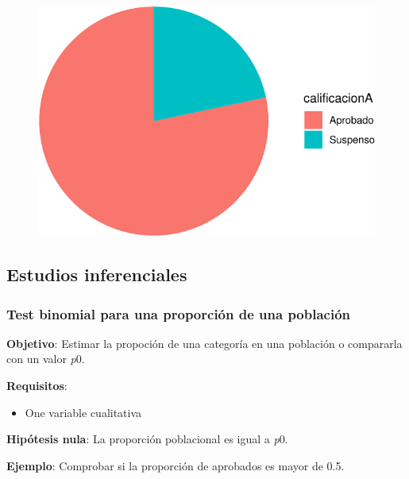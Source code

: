 \documentclass[
  a4paper,
]{scrreport}
\providecommand{\tightlist}{%
  \setlength{\itemsep}{0pt}\setlength{\parskip}{0pt}}\usepackage{longtable,booktabs,array}
\theoremstyle{definition}
\theoremstyle{definition}
\theoremstyle{remark}
\begin{document}
\begin{figure}[H]

{\centering \includegraphics{./08-analisis-estadisticos_files/figure-pdf/unnamed-chunk-23-1.pdf}

}

\end{figure}

\hypertarget{estudios-inferenciales-1}{%
\subsection{Estudios inferenciales}\label{estudios-inferenciales-1}}

\hypertarget{test-binomial-para-una-proporciuxf3n-de-una-poblaciuxf3n}{%
\subsubsection{Test binomial para una proporción de una
población}\label{test-binomial-para-una-proporciuxf3n-de-una-poblaciuxf3n}}

\textbf{Objetivo}: Estimar la propoción de una categoría en una
población o compararla con un valor \emph{p}0.

\textbf{Requisitos}:

\begin{itemize}
\tightlist
\item
  One variable cualitativa
\end{itemize}

\textbf{Hipótesis nula}: La proporción poblacional es igual a \emph{p}0.

\textbf{Ejemplo}: Comprobar si la proporción de aprobados es mayor de
0.5.
\end{document}
